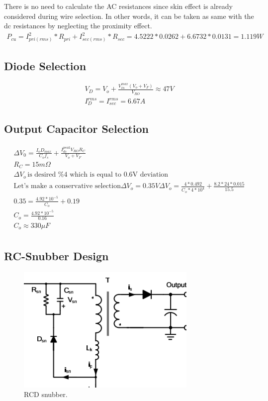 \documentclass{article}
\begin{document}
There is no need to calculate the AC resistances since skin effect is already considered during wire selection. In other words, it can be taken as same with the dc resistances by neglecting the proximity effect.
\begin{gather*}
    P_{cu}=I_{pri(rms)}^2*R_{pri}+ I_{sec(rms)}^2*R_{sec}=4.5222*0.0262+6.6732*0.0131=1.119W
\end{gather*}



 \subsection{Diode Selection}
 \begin{gather*}
     V_D=V_o+\frac{V_{in}^{max}(V_o+V_F)}{V_{RO}}\approx47V\\
     I_D^{rms}=I_{sec}^{rms}=6.67A
 \end{gather*}
 
 \subsection{Output Capacitor Selection}
 \begin{gather*}
     \Delta V_0=\frac{I_oD_{max}}{C_of_s}+\frac{I_{ds}^{peak}V_{RO}R_C}{V_o+V_F}\\
     R_C= 15m\Omega\\
     \Delta V_o \,\text{is desired \%4 which is equal to 0.6V deviation}\\ 
     \text{Let's make a conservative selection} \Delta V_o=0.35V
     \Delta V_o=\frac{4*0.492}{C_o*4*10^4}+\frac{8.2*24*0.015}{15.5}\\
     0.35=\frac{4.92*10^{-5}}{C_o}+0.19\\
     C_o=\frac{4.92*10^{-5}}{0.16}\\
     C_o\approx330\mu F\\
 \end{gather*}
 
 \subsection{RC-Snubber Design}

\begin{figure}[H]
    \centering
    \includegraphics{f9.png}
    \caption{RCD snubber.}
    \label{fig:my_label}
\end{figure}
\end{document}
